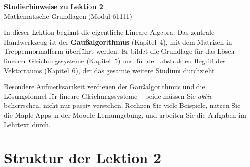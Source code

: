 \documentclass[a4paper,12pt]{article}
\begin{document}
\begin{center}
  {\LARGE\bfseries Studierhinweise zu Lektion 2}\\[0.5em]
  {\large Mathematische Grundlagen (Modul 61111)}
\end{center}

\vspace{1em}

In dieser Lektion beginnt die eigentliche Lineare Algebra. Das zentrale Handwerkzeug
ist der \textbf{Gaußalgorithmus} (Kapitel~4), mit dem Matrizen in Treppennormalform
überführt werden. Er bildet die Grundlage für das Lösen linearer Gleichungssysteme
(Kapitel~5) und für den abstrakten Begriff des Vektorraums (Kapitel~6), der das gesamte
weitere Studium durchzieht.

Besondere Aufmerksamkeit verdienen der Gaußalgorithmus und die Lösungsformel
für lineare Gleichungssysteme – beide müssen Sie \emph{aktiv} beherrschen, nicht
nur passiv verstehen. Rechnen Sie viele Beispiele, nutzen Sie die Maple-Apps in der
Moodle-Lernumgebung, und arbeiten Sie die Aufgaben im Lehrtext durch.

\section*{Struktur der Lektion 2}
\end{document}
